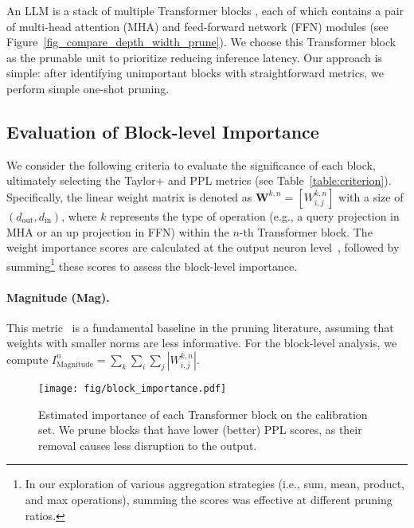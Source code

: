 An LLM is a stack of multiple Transformer blocks \cite{transformer}, each of which contains a pair of multi-head attention (MHA) and feed-forward network (FFN) modules (see Figure~\ref{fig_compare_depth_width_prune}). We choose this Transformer block as the prunable unit to prioritize reducing inference latency. Our approach is simple: after identifying unimportant blocks with straightforward metrics, we perform simple one-shot pruning.

\subsection{Evaluation of Block-level Importance} \label{subsect_crit}
We consider the following criteria to evaluate the significance of each block, ultimately selecting the Taylor+ and PPL metrics (see Table~\ref{table:criterion}). Specifically, the linear weight matrix is denoted as $\mathbf{W}^{k,n} = \left[W_{i,j}^{k,n}\right]$ with a size of $(d_{\mathrm{out}}, d_{\mathrm{in}})$, where $k$ represents the type of operation (e.g., a query projection in MHA or an up projection in FFN) within the $n$-th Transformer block. The weight importance scores are calculated at the output neuron level~\cite{wanda}, followed by summing\footnote{In our exploration of various aggregation strategies (i.e., sum, mean, product, and max operations), summing the scores was effective at different pruning ratios.} these scores to assess the block-level importance.
 
\paragraph{Magnitude (Mag).} This metric~\cite{li2016pruning} is a fundamental baseline in the pruning literature, assuming that weights with smaller norms are less informative. For the block-level analysis, we compute $I_{\mathrm{Magnitude}}^n = \sum_k \sum_i \sum_j \left| W_{i,j}^{k,n} \right|$.

\begin{figure}[t]
\centering
\texttt{[image: fig/block\_importance.pdf]}
\vspace{-0.05in}
\caption{Estimated importance of each Transformer block on the calibration set. We prune blocks that have lower (better) PPL scores, as their removal causes less disruption to the output.}\label{fig_ppl_crit}
\vspace{-0.1in}
\end{figure}


